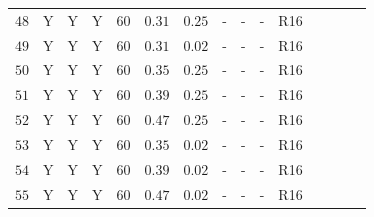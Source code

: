 \begin{center}
\begin{longtable}{@{\extracolsep{\fill}}ccccccccccccccc@{}}
\rule[-1ex]{0pt}{2.5ex} $48$ & Y & Y & Y & $60$ & $0.31 $ & $0.25$ & - & - & - & R16 & \cite{Riess:2016jrr} & \cite{Pietrzynski:2013gia} & \cite{Riess:2016jrr} & \cite{Riess:2016jrr} \\ 
\rule[-1ex]{0pt}{2.5ex} $49$ & Y & Y & Y & $60$ & $0.31 $ & $0.02$ & - & - & - & R16 & \cite{Riess:2016jrr} & \cite{Pietrzynski:2013gia} & \cite{Riess:2016jrr} & \cite{Riess:2016jrr} \\
\rule[-1ex]{0pt}{2.5ex} $50$ & Y & Y & Y & $60$ & $0.35 $ & $0.25$ & - & - & - & R16 & \cite{Riess:2016jrr} & \cite{Pietrzynski:2013gia} & \cite{Riess:2016jrr} & \cite{Riess:2016jrr} \\
\rule[-1ex]{0pt}{2.5ex} $51$ & Y & Y & Y & $60$ & $0.39 $ & $0.25$ & - & - & - & R16 & \cite{Riess:2016jrr} & \cite{Pietrzynski:2013gia} & \cite{Riess:2016jrr} & \cite{Riess:2016jrr} \\
\rule[-1ex]{0pt}{2.5ex} $52$ & Y & Y & Y & $60$ & $0.47 $ & $0.25$ & - & - & - & R16 & \cite{Riess:2016jrr} & \cite{Pietrzynski:2013gia} & \cite{Riess:2016jrr} & \cite{Riess:2016jrr} \\
\rule[-1ex]{0pt}{2.5ex} $53$ & Y & Y & Y & $60$ & $0.35 $ & $0.02$ & - & - & - & R16 & \cite{Riess:2016jrr} & \cite{Pietrzynski:2013gia} & \cite{Riess:2016jrr} & \cite{Riess:2016jrr} \\
\rule[-1ex]{0pt}{2.5ex} $54$ & Y & Y & Y & $60$ & $0.39 $ & $0.02$ & - & - & - & R16 & \cite{Riess:2016jrr} & \cite{Pietrzynski:2013gia} & \cite{Riess:2016jrr} & \cite{Riess:2016jrr} \\
\rule[-1ex]{0pt}{2.5ex} $55$ & Y & Y & Y & $60$ & $0.47 $ & $0.02$ & - & - & - & R16 & \cite{Riess:2016jrr} & \cite{Pietrzynski:2013gia} & \cite{Riess:2016jrr} & \cite{Riess:2016jrr} \\

\end{longtable}
\normalsize
\end{center}


